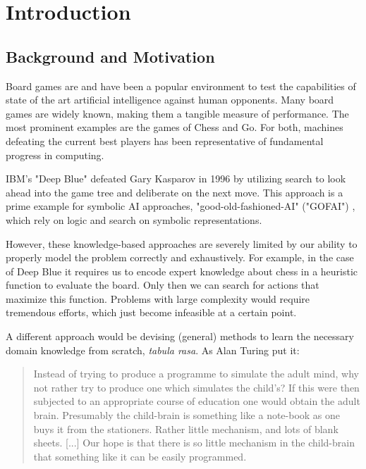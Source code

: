 \chapter{Introduction}

\section{Background and Motivation}
Board games are and have been a popular environment to test the capabilities of state of the art artificial intelligence against human opponents. Many board games are widely known, making them a tangible measure of performance. The most prominent examples are the games of Chess and Go. For both, machines defeating the current best players has been representative of fundamental progress in computing.

IBM's "Deep Blue" defeated Gary Kasparov in 1996 \cite{higgins_brief_2017} by utilizing search to look ahead into the game tree and deliberate on the next move. This approach is a prime example for symbolic AI approaches, "good-old-fashioned-AI" ("GOFAI") \cite[p. 112f]{haugeland_artificial_1985}, which rely on logic and search on symbolic representations.

However, these knowledge-based approaches are severely limited by our ability to properly model the problem correctly and exhaustively. For example, in the case of Deep Blue it requires us to encode expert knowledge about chess in a heuristic function to evaluate the board. Only then we can search for actions that maximize this function. Problems with large complexity would require tremendous efforts, which just become infeasible at a certain point.

A different approach would be devising (general) methods to learn the necessary domain knowledge from scratch,  \emph{tabula rasa}. As Alan Turing put it:

\begin{quote}
    Instead of trying to produce a programme to simulate the adult mind, why not rather try to produce one which simulates the child’s? If this were then subjected to an appropriate course of education one would obtain the adult brain. Presumably the child-brain is something like a note-book as one buys it from the stationers. Rather little mechanism, and lots of blank sheets. [...] Our hope is that there is so little mechanism in the child-brain that something like it can be easily programmed.
    \cite{turing_icomputing_1950}
\end{quote}

